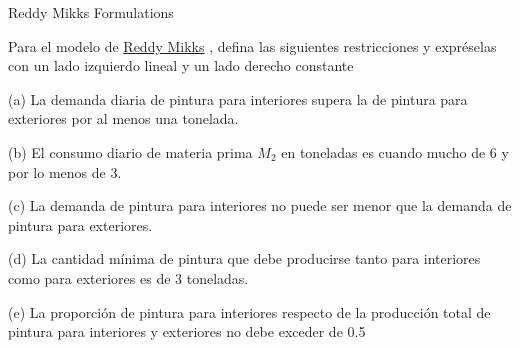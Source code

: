 \begin{frameact}{Reddy Mikks Formulations}{}

\label{act:taha_02-01A-01}
  Para el modelo de \hyperlink{act:reddy-mikks}{Reddy Mikks} , defina las siguientes restricciones y expréselas con un lado izquierdo lineal y un lado derecho constante

(a) La demanda diaria de pintura para interiores supera la de pintura para exteriores
por al menos una tonelada.

(b) El consumo diario de materia prima $M_2$ en toneladas es cuando mucho de 6 y por
lo menos de 3.

(c) La demanda de pintura para interiores no puede ser menor que la demanda de pintura para exteriores.

(d) La cantidad mínima de pintura que debe producirse tanto para interiores como para exteriores es de 3 toneladas.

(e) La proporción de pintura para interiores respecto de la producción total de pintura
para interiores y exteriores no debe exceder de 0.5

\end{frameact}



